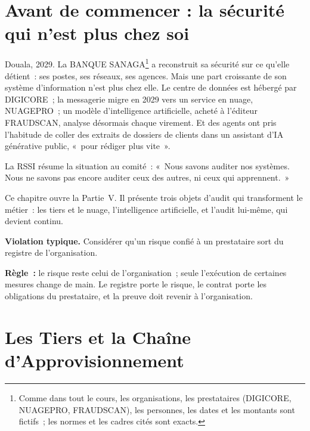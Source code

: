 \bigskip

\section*{Avant de commencer : la sécurité qui n'est plus chez soi}

Douala, 2029. La BANQUE SANAGA\footnote{Comme dans tout le cours, les
organisations, les prestataires (DIGICORE, NUAGEPRO, FRAUDSCAN), les
personnes, les dates et les montants sont fictifs~; les normes et les
cadres cités sont exacts.} a reconstruit sa sécurité sur ce qu'elle
détient~: ses postes, ses réseaux, ses agences. Mais une part croissante de
son système d'information n'est plus chez elle. Le centre de données est
hébergé par DIGICORE~; la messagerie migre en 2029 vers un service en nuage,
NUAGEPRO~; un modèle d'intelligence artificielle, acheté à l'éditeur
FRAUDSCAN, analyse désormais chaque virement. Et des agents ont pris
l'habitude de coller des extraits de dossiers de clients dans un assistant
d'IA générative public, «~pour rédiger plus vite~».

La RSSI résume la situation au comité~: «~Nous savons auditer nos systèmes.
Nous ne savons pas encore auditer ceux des autres, ni ceux qui
apprennent.~»

\medskip

Ce chapitre ouvre la Partie~V. Il présente trois objets d'audit qui
transforment le métier~: les tiers et le nuage, l'intelligence
artificielle, et l'audit lui-même, qui devient continu.

\begin{boxalert}
\textbf{Violation typique.} Considérer qu'un risque confié à un prestataire
sort du registre de l'organisation.

\smallskip
\textbf{Règle~:} le risque reste celui de l'organisation~; seule
l'exécution de certaines mesures change de main. Le registre porte le
risque, le contrat porte les obligations du prestataire, et la preuve doit
revenir à l'organisation.
\end{boxalert}

\separateur

\section{Les Tiers et la Chaîne d'Approvisionnement}
\label{sec:c15-tiers}


